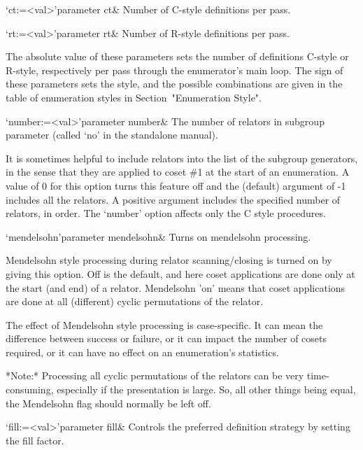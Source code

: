 
\beginitems

\>`ct:=<val>'{parameter ct}&
Number of C-style definitions per pass.

\>`rt:=<val>'{parameter rt}&
Number of R-style definitions per pass.


The absolute value of these  parameters sets the number of definitions
C-style  or R-style,  respectively per  pass through  the enumerator's
main  loop.  The  sign of  these parameters  sets the  style,  and the
possible  combinations are given  in the  table of  enumeration styles
in Section~"Enumeration Style".


\>`number:=<val>'{parameter  number}&   The  number  of   relators  in
subgroup parameter (called `no' in the standalone manual).

It  is sometimes  helpful to  include relators  into the  list  of the
subgroup generators, in  the sense that they are  applied to coset \#1
at the  start of an enumeration.  A  value of 0 for  this option turns
this feature  off and  the (default) argument  of -1 includes  all the
relators.   A  positive  argument  includes the  specified  number  of
relators,  in order.   The `number'  option affects  only the  C style
procedures.


\>`mendelsohn'{parameter mendelsohn}&
Turns on mendelsohn processing.

Mendelsohn style processing  during relator scanning/closing is turned
on  by  giving  this option.   Off  is  the  default, and  here  coset
applications  are done  only  at the  start  (and end)  of a  relator.
Mendelsohn  'on'  means  that  coset  applications  are  done  at  all
(different)  cyclic permutations of  the relator.   

The effect  of Mendelsohn style  processing is case-specific.   It can
mean the difference  between success or failure, or  it can impact the
number  of  cosets   required,  or  it  can  have   no  effect  on  an
enumeration's statistics.

*Note:* Processing all cyclic permutations of the relators can be very
time-consuming,  especially if  the  presentation is  large.  So,  all
other things being equal, the  Mendelsohn flag should normally be left
off.


\>`fill:=<val>'{parameter fill}&
Controls the preferred definition strategy by setting the fill factor.

